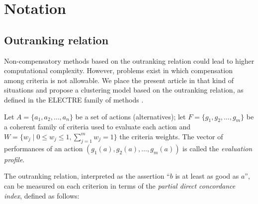 \documentclass[]{elsarticle}
\theoremstyle{definition}
\begin{document}
%
%
%


\section{Notation}\label{notation}

\subsection{Outranking relation}\label{classification}

Non-compensatory methods based on the outranking relation could lead to higher computational complexity. However, problems exist in which compensation among criteria is not allowable. We place the present article in that kind of situations and propose a clustering model based on the outranking relation, as defined in the ELECTRE family of methods \citep{figueira2010}.

Let $A=\{a_1,a_2,\ldots,a_n\}$ be a set of actions (alternatives);  let $F=\{g_1,g_2,\ldots,g_m\}$ be a coherent family of criteria used to evaluate each action and $W=\{w_j \mid 0 \leq w_j \leq 1, \sum_{j=1}^m w_j =1\}$ the criteria weights.  The vector of performances of an action  $(g_1(a),g_2(a),\ldots,g_m(a))$   is called the \emph{evaluation profile}. 



The outranking relation, interpreted as the assertion ``$b$ is at least as good as $a$'',  can be measured on each criterion in terms of  the \emph{partial direct concordance index}, defined as follows: 
\end{document}
